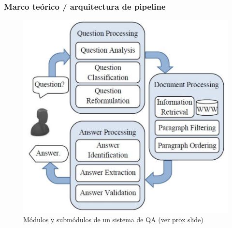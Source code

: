\begin{frame}
\frametitle{Marco teórico / arquitectura de pipeline}
  \begin{figure}
      \includegraphics[scale=0.4]{graficos/qa-open-domain}
    \caption{Módulos y submódulos de un sistema de QA (ver prox slide)}
    \label{fig:tareas}
  \end{figure}
\end{frame}


